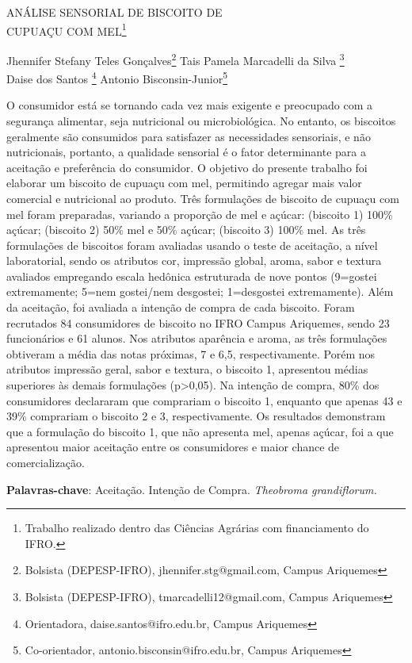 \documentclass[article,12pt,onesidea,4paper,english,brazil]{abntex2}
\begin{document}
	
	
	\frenchspacing 
	
	\begin{center}
		\LARGE ANÁLISE SENSORIAL DE BISCOITO DE\\CUPUAÇU COM MEL\footnote{Trabalho realizado dentro das Ciências Agrárias com financiamento do IFRO.}
		
		\normalsize
		Jhennifer Stefany Teles Gonçalves\footnote{Bolsista (DEPESP-IFRO), jhennifer.stg@gmail.com, Campus Ariquemes} 
		Tais Pamela Marcadelli da Silva	\footnote{Bolsista (DEPESP-IFRO), tmarcadelli12@gmail.com, Campus Ariquemes} \\
		Daise dos Santos \footnote{Orientadora, daise.santos@ifro.edu.br, Campus Ariquemes} 
		Antonio Bisconsin-Junior\footnote{Co-orientador, antonio.bisconsin@ifro.edu.br, Campus Ariquemes}
	\end{center}

\noindent O consumidor está se tornando cada vez mais exigente e preocupado com a segurança alimentar, seja nutricional ou microbiológica. No entanto, os biscoitos geralmente são consumidos para satisfazer as necessidades sensoriais, e não nutricionais, portanto, a qualidade sensorial é o fator determinante para a aceitação e preferência do consumidor. O objetivo do presente trabalho foi elaborar um  biscoito de cupuaçu com mel, permitindo agregar mais valor comercial e nutricional ao produto. Três formulações de biscoito de cupuaçu com mel foram preparadas, variando a proporção de mel e açúcar: (biscoito 1) 100\% açúcar; (biscoito 2) 50\% mel e 50\% açúcar; (biscoito 3) 100\% mel. As três formulações de biscoitos foram avaliadas usando o teste de aceitação, a nível laboratorial, sendo os atributos cor, impressão global, aroma, sabor e textura avaliados empregando escala hedônica estruturada de nove pontos (9=gostei extremamente; 5=nem gostei/nem desgostei; 1=desgostei extremamente). Além da aceitação, foi avaliada a intenção de compra de cada biscoito. Foram recrutados 84 consumidores de biscoito no IFRO Campus Ariquemes, sendo 23 funcionários e 61 alunos. Nos atributos aparência e aroma, as três formulações obtiveram a média das notas próximas, 7 e 6,5, respectivamente. Porém nos atributos impressão geral, sabor e textura, o biscoito 1, apresentou médias superiores às demais formulações (p>0,05). Na intenção de compra, 80\% dos consumidores declararam que comprariam o biscoito 1, enquanto que apenas 43 e 39\% comprariam o biscoito 2 e 3, respectivamente. Os resultados demonstram que a formulação do biscoito 1, que não apresenta mel, apenas açúcar, foi a que apresentou maior aceitação entre os consumidores e maior chance de comercialização.

\vspace{\onelineskip}

\noindent
\textbf{Palavras-chave}: Aceitação. Intenção de Compra. \textit{Theobroma grandiflorum.}
\end{document}
